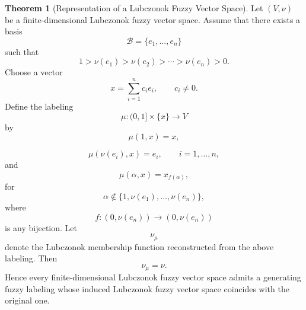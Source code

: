 \documentclass[preprint,12pt]{elsarticle}
\theoremstyle{definition}
\newtheorem{theorem}{Theorem}[section]
\begin{document}
	
	
	\begin{theorem}[Representation of a Lubczonok Fuzzy Vector Space]
		\label{thm:representation}
		Let $(V,\nu)$ be a finite-dimensional Lubczonok fuzzy vector space.
		Assume that there exists a basis
		\[
		\mathcal B=\{e_1,\ldots,e_n\}
		\]
			such that
		\[
		1>\nu(e_1)>\nu(e_2)>\cdots>\nu(e_n)>0.
		\]
	   Choose a vector
		\[
		x=\sum_{i=1}^{n}c_ie_i,
		\qquad
		c_i\neq0.
		\]
		Define the labeling
		\[
		\mu:(0,1]\times\{x\}\longrightarrow V
		\]
		by
		\[
		\mu(1,x)=x,
		\]
		
		\[
		\mu(\nu(e_i),x)=e_i,
		\qquad
		i=1,\ldots,n,
		\]
		and
		\[
		\mu(\alpha,x)=x_{f(\alpha)},
		\]
		for
		\[
		\alpha\notin
		\{1,\nu(e_1),\ldots,\nu(e_n)\},
		\]
		where
		\[
		f:
		\left(0,\nu(e_n)\right)
		\longrightarrow
		\left(0,\nu(e_n)\right)
		\]
		is any bijection.
		Let
		\[
		\nu_\mu
		\]
		denote the Lubczonok membership function reconstructed from the above
		labeling.
		Then
		\[
		\nu_\mu=\nu.
		\]
		Hence every finite-dimensional Lubczonok fuzzy vector space admits a
		generating fuzzy labeling whose induced Lubczonok fuzzy vector space
		coincides with the original one.
		
	\end{theorem}
	
\end{document}
